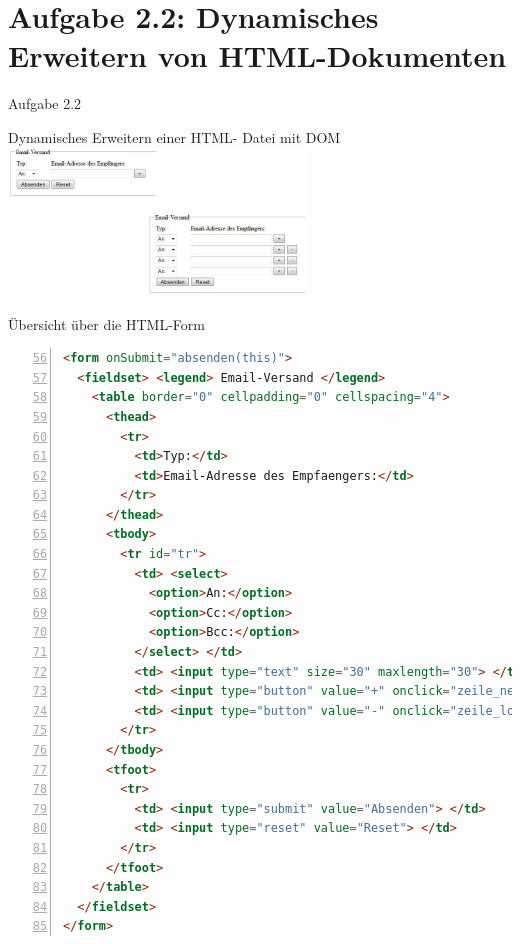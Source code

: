 \section{Aufgabe 2.2: Dynamisches Erweitern von HTML-Dokumenten}
\begin{frame}[<+->]{Aufgabe 2.2}
\begin{center}
\normalsize{
Dynamisches Erweitern einer HTML- Datei mit DOM}
\includegraphics[width = 300px]{../A2/src/formular1.jpg}
\end{center}
\end{frame}
\begin{frame}[<+->][fragile]{Übersicht über die HTML-Form}
\tiny{\begin{lstlisting}[language = HTML,
                                   mathescape = true, 
                   breaklines=true, 
                   numbers = left,
	        firstnumber= 56, 
                   numbersep = 3pt]
<form onSubmit="absenden(this)">
  <fieldset> <legend> Email-Versand </legend>
    <table border="0" cellpadding="0" cellspacing="4">
      <thead>
        <tr>
          <td>Typ:</td>
          <td>Email-Adresse des Empfaengers:</td>
        </tr>
      </thead>
      <tbody>
        <tr id="tr">
          <td> <select>
            <option>An:</option>
            <option>Cc:</option>
            <option>Bcc:</option>
          </select> </td>
          <td> <input type="text" size="30" maxlength="30"> </td>
          <td> <input type="button" value="+" onclick="zeile_neu()"> </td>
          <td> <input type="button" value="-" onclick="zeile_loeschen(this.parentNode)" style="visibility:hidden"> </td>
        </tr>
      </tbody>
      <tfoot>
        <tr>
          <td> <input type="submit" value="Absenden"> </td>
          <td> <input type="reset" value="Reset"> </td>
        </tr>
      </tfoot>
    </table>
  </fieldset>
</form>
\end{lstlisting}}
\end{frame}
